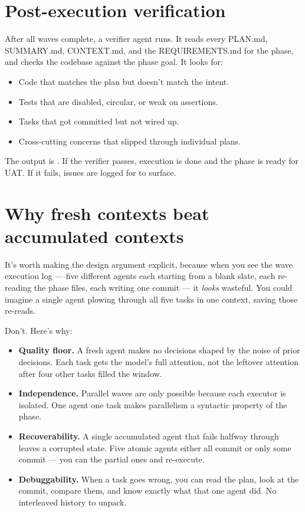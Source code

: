 \documentclass[11pt,letterpaper,openany]{book}
\begin{document}
\section{Post-execution verification}

After all waves complete, a verifier agent runs. It reads every PLAN.md, SUMMARY.md, CONTEXT.md, and the REQUIREMENTS.md for the phase, and checks the codebase against the phase goal. It looks for:

\begin{itemize}[itemsep=2pt]
  \item Code that matches the plan but doesn't match the intent.
  \item Tests that are disabled, circular, or weak on assertions.
  \item Tasks that got committed but not wired up.
  \item Cross-cutting concerns that slipped through individual plans.
\end{itemize}

The output is . If the verifier passes, execution is done and the phase is ready for UAT. If it fails, issues are logged for  to surface.

\section{Why fresh contexts beat accumulated contexts}

It's worth making the design argument explicit, because when you see the wave execution log --- five different agents each starting from a blank slate, each re-reading the phase files, each writing one commit --- it \emph{looks} wasteful. You could imagine a single agent plowing through all five tasks in one context, saving those re-reads.

Don't. Here's why:

\begin{itemize}[itemsep=2pt]
  \item \textbf{Quality floor.} A fresh agent makes no decisions shaped by the noise of prior decisions. Each task gets the model's full attention, not the leftover attention after four other tasks filled the window.
  \item \textbf{Independence.} Parallel waves are only possible because each executor is isolated. One agent one task makes parallelism a syntactic property of the phase.
  \item \textbf{Recoverability.} A single accumulated agent that fails halfway through leaves a corrupted state. Five atomic agents either all commit or only some commit --- you can  the partial ones and re-execute.
  \item \textbf{Debuggability.} When a task goes wrong, you can read the plan, look at the commit, compare them, and know exactly what that one agent did. No interleaved history to unpack.
\end{itemize}
\end{document}
